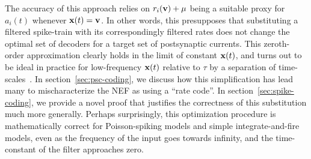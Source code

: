 
The accuracy of this approach relies on $r_i(\mathbf{v}) + \mu$ being a suitable proxy for $a_i(t)$ whenever $\mathbf{x}(t) = \mathbf{v}$.
In other words, this presupposes that substituting a filtered spike-train with its correspondingly filtered rates does not change the optimal set of decoders for a target set of postsynaptic currents.
This zeroth-order approximation clearly holds in the limit of constant $\mathbf{x}(t)$, and turns out to be ideal in practice for low-frequency $\mathbf{x}(t)$ relative to $\tau$ by a separation of time-scales~\citep[][appendix~F.1]{eliasmith2003a}.
In section~\ref{sec:psc-coding}, we discuss how this simplification has lead many to mischaracterize the NEF as using a ``rate code''.
In section~\ref{sec:spike-coding}, we provide a novel proof that justifies the correctness of this substitution much more generally.
Perhaps surprisingly, this optimization procedure is mathematically correct for Poisson-spiking models and simple integrate-and-fire models, even as the frequency of the input goes towards infinity, and the time-constant of the filter approaches zero.

